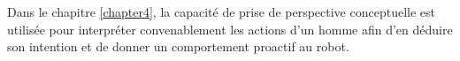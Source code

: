\documentclass[a4paper,11pt,twoside]{StyleThese}
\begin{document}
Dans le chapitre \ref{chapter4}, la capacité de prise de perspective conceptuelle
est utilisée pour interpréter convenablement les actions d'un homme afin d'en déduire son intention et de donner un comportement proactif au robot.




















\ifdefined{}
\else


\end{document}

